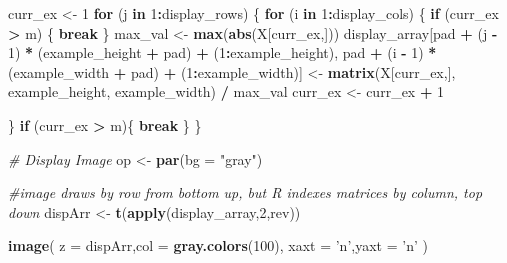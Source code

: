 \documentclass[
]{book}
\newenvironment{Shaded}{\begin{snugshade}}{\end{snugshade}}
\newcommand{\CommentTok}[1]{\textcolor[rgb]{0.56,0.35,0.01}{\textit{#1}}}
\newcommand{\ControlFlowTok}[1]{\textcolor[rgb]{0.13,0.29,0.53}{\textbf{#1}}}
\newcommand{\DataTypeTok}[1]{\textcolor[rgb]{0.13,0.29,0.53}{#1}}
\newcommand{\DecValTok}[1]{\textcolor[rgb]{0.00,0.00,0.81}{#1}}
\newcommand{\KeywordTok}[1]{\textcolor[rgb]{0.13,0.29,0.53}{\textbf{#1}}}
\newcommand{\NormalTok}[1]{#1}
\newcommand{\OperatorTok}[1]{\textcolor[rgb]{0.81,0.36,0.00}{\textbf{#1}}}
\newcommand{\StringTok}[1]{\textcolor[rgb]{0.31,0.60,0.02}{#1}}
\begin{document}
\begin{Shaded}
\begin{Highlighting}[]
\NormalTok{        curr_ex <-}\StringTok{ }\DecValTok{1}
        \ControlFlowTok{for}\NormalTok{ (j }\ControlFlowTok{in} \DecValTok{1}\OperatorTok{:}\NormalTok{display_rows) \{}
                \ControlFlowTok{for}\NormalTok{ (i }\ControlFlowTok{in} \DecValTok{1}\OperatorTok{:}\NormalTok{display_cols) \{}
                        \ControlFlowTok{if}\NormalTok{ (curr_ex }\OperatorTok{>}\StringTok{ }\NormalTok{m) \{}
                                \ControlFlowTok{break}
\NormalTok{                        \}}
\NormalTok{                        max_val <-}\StringTok{ }\KeywordTok{max}\NormalTok{(}\KeywordTok{abs}\NormalTok{(X[curr_ex,]))}
\NormalTok{                        display_array[pad }\OperatorTok{+}\StringTok{ }\NormalTok{(j }\OperatorTok{-}\StringTok{ }\DecValTok{1}\NormalTok{) }\OperatorTok{*}\StringTok{ }\NormalTok{(example_height }\OperatorTok{+}\StringTok{ }\NormalTok{pad) }\OperatorTok{+}\StringTok{ }\NormalTok{(}\DecValTok{1}\OperatorTok{:}\NormalTok{example_height),}
\NormalTok{                                pad }\OperatorTok{+}\StringTok{ }\NormalTok{(i }\OperatorTok{-}\StringTok{ }\DecValTok{1}\NormalTok{) }\OperatorTok{*}\StringTok{ }\NormalTok{(example_width }\OperatorTok{+}\StringTok{ }\NormalTok{pad) }\OperatorTok{+}\StringTok{ }\NormalTok{(}\DecValTok{1}\OperatorTok{:}\NormalTok{example_width)] <-}
\StringTok{                        }\KeywordTok{matrix}\NormalTok{(X[curr_ex,], example_height, example_width) }\OperatorTok{/}\StringTok{ }\NormalTok{max_val}
\NormalTok{                        curr_ex <-}\StringTok{ }\NormalTok{curr_ex }\OperatorTok{+}\StringTok{ }\DecValTok{1}

\NormalTok{                \}}
                \ControlFlowTok{if}\NormalTok{ (curr_ex }\OperatorTok{>}\StringTok{ }\NormalTok{m)\{}
                        \ControlFlowTok{break}
\NormalTok{                \}        }
\NormalTok{        \}}
        
        \CommentTok{# Display Image}
\NormalTok{  op <-}\StringTok{ }\KeywordTok{par}\NormalTok{(}\DataTypeTok{bg =} \StringTok{"gray"}\NormalTok{)}
  
  \CommentTok{#image draws by row from bottom up, but R indexes matrices by column, top down}
\NormalTok{  dispArr <-}\StringTok{ }\KeywordTok{t}\NormalTok{(}\KeywordTok{apply}\NormalTok{(display_array,}\DecValTok{2}\NormalTok{,rev))}
  
  \KeywordTok{image}\NormalTok{(}
    \DataTypeTok{z =}\NormalTok{ dispArr,}\DataTypeTok{col =} \KeywordTok{gray.colors}\NormalTok{(}\DecValTok{100}\NormalTok{), }\DataTypeTok{xaxt =} \StringTok{'n'}\NormalTok{,}\DataTypeTok{yaxt =} \StringTok{'n'}
\NormalTok{  )}
  

\end{Highlighting}
\end{Shaded}
\end{document}

